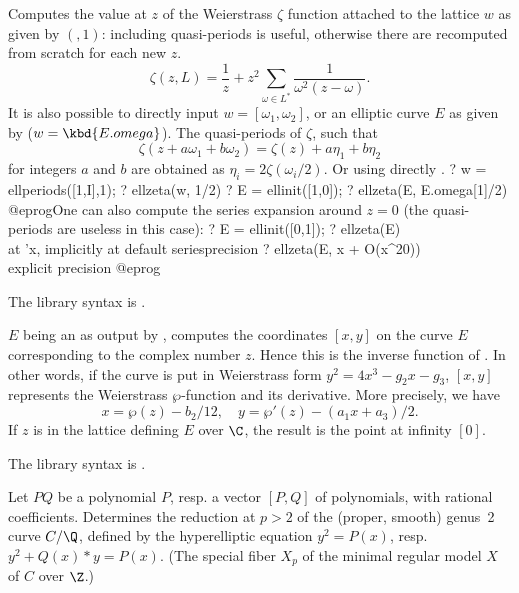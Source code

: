 \label{se:ellzeta}
Computes the value at $z$ of the Weierstrass $\zeta$ function attached to
the lattice $w$ as given by $(,1)$: including quasi-periods
is useful, otherwise there are recomputed from scratch for each new $z$.
$$ \zeta(z, L) = \dfrac{1}{z} + z^2\sum_{\omega\in L^*}
\dfrac{1}{\omega^2(z-\omega)}.$$
It is also possible to directly input $w = [\omega_1,\omega_2]$,
or an elliptic curve $E$ as given by  ($w = \kbd{E.omega}$).
The quasi-periods of $\zeta$, such that
$$\zeta(z + a\omega_1 + b\omega_2) = \zeta(z) + a\eta_1 + b\eta_2 $$
for integers $a$ and $b$ are obtained as $\eta_i = 2\zeta(\omega_i/2)$.
Or using directly .
\bprog
? w = ellperiods([1,I],1);
? ellzeta(w, 1/2)
? E = ellinit([1,0]);
? ellzeta(E, E.omega[1]/2)
@eprog\noindent One can also compute the series expansion around $z = 0$
(the quasi-periods are useless in this case):
\bprog
? E = ellinit([0,1]);
? ellzeta(E) \\ at 'x, implicitly at default seriesprecision
? ellzeta(E, x + O(x^20)) \\ explicit precision
@eprog\noindent

The library syntax is .

\label{se:ellztopoint}
$E$ being an  as output by
, computes the coordinates $[x,y]$ on the curve $E$
corresponding to the complex number $z$. Hence this is the inverse function
of . In other words, if the curve is put in Weierstrass
form $y^2 = 4x^3 - g_2x - g_3$, $[x,y]$ represents the Weierstrass
$\wp$-function and its derivative. More
precisely, we have
$$x = \wp(z) - b_2/12,\quad y = \wp'(z) - (a_1 x + a_3)/2.$$
If $z$ is in the lattice defining $E$ over $\C$, the result is the point at
infinity $[0]$.

The library syntax is .

\label{se:genus2red}
Let $PQ$ be a polynomial $P$, resp. a vector $[P,Q]$ of polynomials, with
rational coefficients.
Determines the reduction at $p > 2$ of the (proper, smooth) genus~2
curve $C/\Q$, defined by the hyperelliptic equation $y^2 = P(x)$, resp.
$y^2 + Q(x)*y = P(x)$.
(The special fiber $X_p$ of the minimal regular model $X$ of $C$ over $\Z$.)

